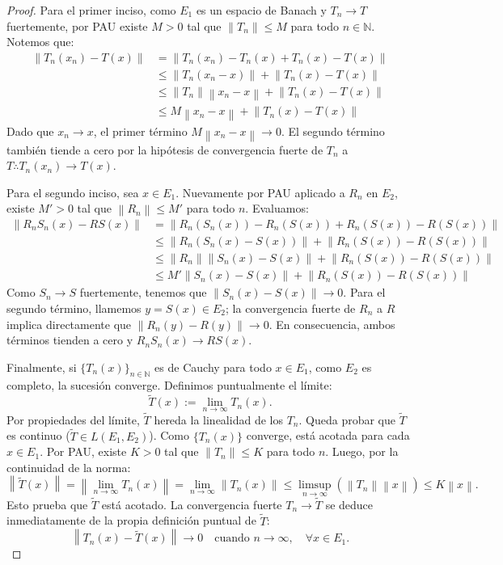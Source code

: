 \documentclass{article}
\theoremstyle{definition}
\newcommand{\N}{\mathbb{N}}
\newcommand{\norm}[1]{\left\lVert #1 \right\rVert}       %
\begin{document}
\begin{proof}
    Para el primer inciso, como \(E_1\) es un espacio de Banach y \(T_n \to T\) fuertemente, por PAU existe \( M > 0 \) tal que \(\norm{T_n} \leq M\) para todo \( n \in \N \). Notemos que:
    \begin{align*}
        \norm{T_n(x_n) - T(x)} & = \norm{T_n(x_n) - T_n(x) + T_n(x) - T(x)}            \\
                               & \leq \norm{T_n(x_n - x)} + \norm{T_n(x) - T(x)}       \\
                               & \leq \norm{T_n} \norm{x_n - x} + \norm{T_n(x) - T(x)} \\
                               & \leq M \norm{x_n - x} + \norm{T_n(x) - T(x)}
    \end{align*}
    Dado que \(x_n \to x\), el primer término \(M \norm{x_n - x} \to 0\). El segundo término también tiende a cero por la hipótesis de convergencia fuerte de \(T_n\) a \(T \therefore T_n(x_n) \to T(x)\).

    Para el segundo inciso, sea \(x \in E_1\). Nuevamente por PAU aplicado a \(R_n\) en \(E_2\), existe \(M' > 0\) tal que \(\norm{R_n} \leq M'\) para todo \(n\). Evaluamos:
    \begin{align*}
        \norm{R_n S_n(x) - R S(x)} & = \norm{R_n(S_n(x)) - R_n(S(x)) + R_n(S(x)) - R(S(x))}            \\
                                   & \leq \norm{R_n(S_n(x) - S(x))} + \norm{R_n(S(x)) - R(S(x))}       \\
                                   & \leq \norm{R_n} \norm{S_n(x) - S(x)} + \norm{R_n(S(x)) - R(S(x))} \\
                                   & \leq M' \norm{S_n(x) - S(x)} + \norm{R_n(S(x)) - R(S(x))}
    \end{align*}
    Como \(S_n \to S\) fuertemente, tenemos que \(\norm{S_n(x) - S(x)} \to 0\). Para el segundo término, llamemos \(y = S(x) \in E_2\); la convergencia fuerte de \(R_n\) a \(R\) implica directamente que \(\norm{R_n(y) - R(y)} \to 0\). En consecuencia, ambos términos tienden a cero y \(R_n S_n(x) \to R S(x)\).

    Finalmente, si \({\{ T_n(x) \}}_{n\in\N}\) es de Cauchy para todo \(x \in E_1\), como \(E_2\) es completo, la sucesión converge. Definimos puntualmente el límite:
    \[
        \tilde T(x) := \lim_{n \to \infty} T_n(x).
    \]
    Por propiedades del límite, \(\tilde{T}\) hereda la linealidad de los \(T_n\). Queda probar que \(\tilde{T}\) es continuo (\(\tilde{T} \in L(E_1,E_2)\)). Como \( \{T_n(x)\} \) converge, está acotada para cada \(x \in E_1\). Por PAU, existe \(K > 0\) tal que \(\norm{T_n} \leq K\) para todo \(n\). Luego, por la continuidad de la norma:
    \[
        \norm{\tilde{T}(x)} = \norm{\lim_{n \to \infty} T_n(x)} = \lim_{n \to \infty} \norm{T_n(x)} \leq \limsup_{n \to \infty} \left( \norm{T_n} \norm{x} \right) \leq K \norm{x}.
    \]
    Esto prueba que \(\tilde{T}\) está acotado. La convergencia fuerte \(T_n \to \tilde T\) se deduce inmediatamente de la propia definición puntual de \(\tilde{T}\):
    \[
        \norm{T_n(x) - \tilde T(x)} \to 0 \quad \text{cuando } n \to \infty, \quad \forall x \in E_1.
    \]
\end{proof}
\end{document}
